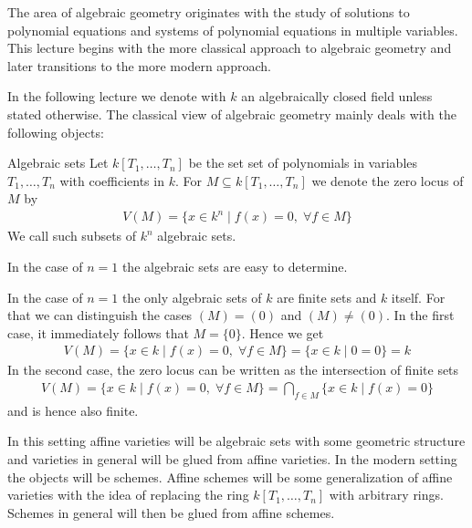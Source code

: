 \documentclass[../notes.tex]{subfiles}
\begin{document}
The area of algebraic geometry originates with the study of solutions to polynomial equations
and systems of polynomial equations in multiple variables. This lecture begins with the more
classical approach to algebraic geometry and later transitions to the more modern approach.

\smallskip
\noindent
In the following lecture we denote with $k$ an algebraically closed field unless stated
otherwise. The classical view of algebraic geometry mainly deals with the following objects:

\smallskip

\begin{defi}{Algebraic sets}{}
  Let $k[T_1, \dots, T_n]$ be the set set of polynomials in variables $T_1, \dots, T_n$ with
  coefficients in $k$. For $M \subseteq k[T_1, \dots, T_n]$ we denote the zero locus
  of $M$ by
  \begin{align*}
    V(M) = \{x \in k^n \mid f(x) = 0 , \; \forall f \in M\}
  \end{align*}
  We call such subsets of $k^n$ algebraic sets.
\end{defi}

\smallskip
\noindent
In the case of $n = 1$ the algebraic sets are easy to determine.

\smallskip

\begin{ex}{}{}
  In the case of $n = 1$ the only algebraic sets of $k$ are finite sets and $k$ itself.
  For that we can distinguish the cases
  $(M) = (0)$ and $(M) \neq (0)$.
  In the first case, it immediately follows that $M = \{0\}$. Hence we get
  \begin{align*}
    V(M) = \{x \in k \mid f(x) = 0, \; \forall f \in M\} = \{x \in k \mid 0 = 0\}
    = k
  \end{align*}
  In the second case, the zero locus can be written as the intersection of finite sets
  \begin{align*}
    V(M) = \{x \in k \mid f(x) = 0, \; \forall f \in M\} =
    \bigcap_{f \in M} \{x \in k \mid f(x) = 0 \} 
  \end{align*}
  and is hence also finite.
\end{ex}

\smallskip
\noindent
In this setting affine varieties will be algebraic sets with some geometric structure
and varieties in general will be glued from affine varieties. In the modern setting
the objects will be schemes. Affine schemes will be some generalization of affine varieties
with the idea of replacing the ring $k[T_1, \dots, T_n]$ with arbitrary rings.
Schemes in general will then be glued from affine schemes.
\end{document}
